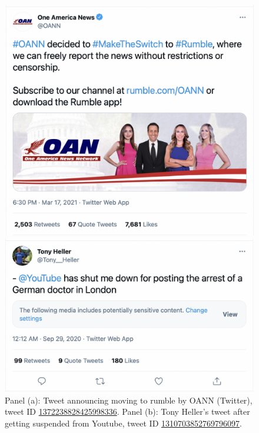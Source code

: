 \documentclass[11pt,a4paper]{article}
\begin{document}
\begin{figure}
\centering
\begin{multicols}{1}

    \includegraphics[scale=0.25]{./img/oann/fig3_oann.png}\par 
    \end{multicols}
\begin{multicols}{1}

    \includegraphics[scale=0.25]{./img/tony/fig3_tony.png}\par
\end{multicols}
\caption{Panel (a): Tweet announcing moving to rumble by OANN (Twitter), tweet ID \href{https://twitter.com/OANN/status/1372238828425998336}{1372238828425998336}. Panel (b): Tony Heller's tweet after getting suspended from Youtube, tweet ID \href{https://twitter.com/Tony\_Heller/status/1310703852769796097}{1310703852769796097}. }
\label{fig2_oann}
\end{figure}
\end{document}
